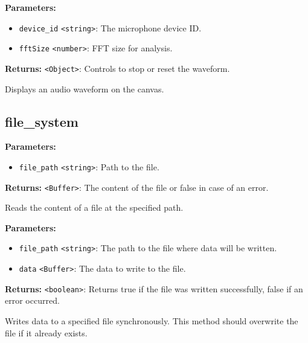 \documentclass[12pt,a4paper]{article}
\begin{document}
\noindent \textbf{Parameters:}
\begin{itemize}
  \item \texttt{device\_id} \texttt{<string>}: The microphone device ID.
  \item \texttt{fftSize} \texttt{<number>}: FFT size for analysis.
\end{itemize}

\noindent \textbf{Returns:} \texttt{<Object>}: Controls to stop or reset the waveform.

\noindent Displays an audio waveform on the canvas.


\subsection{file\_system}
\vspace{5mm}
\noindent {}


\noindent \textbf{Parameters:}
\begin{itemize}
  \item \texttt{file\_path} \texttt{<string>}: Path to the file.
\end{itemize}

\noindent \textbf{Returns:} \texttt{<Buffer>}: The content of the file or false in case of an error.

\noindent Reads the content of a file at the specified path.

\vspace{5mm}
\noindent {}


\noindent \textbf{Parameters:}
\begin{itemize}
  \item \texttt{file\_path} \texttt{<string>}: The path to the file where data will be written.
  \item \texttt{data} \texttt{<Buffer>}: The data to write to the file.
\end{itemize}

\noindent \textbf{Returns:} \texttt{<boolean>}: Returns true if the file was written successfully, false if an error occurred.

\noindent Writes data to a specified file synchronously. This method should overwrite the file if it already exists.
\end{document}
